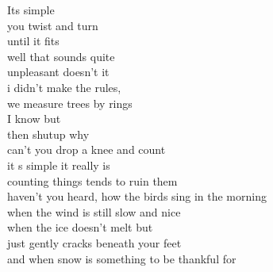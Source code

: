 Its simple\\
you twist and turn\\
until it fits\\
well that sounds quite\\
unpleasant doesn't it\\
i didn't make the rules,\\
we measure trees by rings\\
I know but\\
then shutup why\\
can't you drop a knee and count\\
it s simple it really is\\
counting things tends to ruin them\\
haven't you heard, 
how the birds sing in the morning\\
when the wind is still slow and nice\\
when the ice doesn't melt but \\
just gently cracks beneath your feet\\
and when snow is something to be thankful for\\
